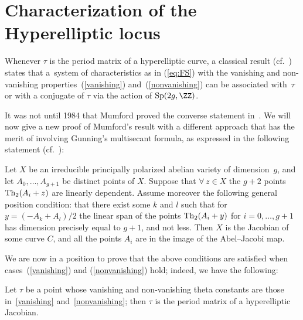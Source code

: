 \section{Characterization of the Hyperelliptic locus}
Whenever $\tau$ is the period matrix of a hyperelliptic curve, a classical result (cf.~\cite{Th}) states that a~system of characteristics as in (\ref{eq:FS}) with the vanishing and non-vanishing properties~(\ref{vanishing}) and~(\ref{nonvanishing}) can be associated with~$\tau$ or with a conjugate of $\tau$ via the action of ${\rm Sp}(2g, \ZZ)$.

 It was not until 1984 that Mumford proved the converse statement in~\cite{mu}. We will now give a new proof of Mumford's result with a different approach that has the merit of involving Gunning's multisecant formula, as expressed in the following statement (cf.~\cite{Gu}):
 \begin{Theorem} Let $X$ be an irreducible principally polarized abelian variety of dimension~$g$, and let $A_0, \dots , A_{g+1}$ be distinct points of $X$. Suppose that $\forall\, z\in X$ the $g + 2 $ points ${\rm Th}_2(A_i + z) $ are linearly dependent.
Assume moreover the following general position condition: that there
exist some $k$ and $l$ such that for $y=(-A_k+A_l)/2$ the linear span of the points ${\rm Th}_2(A_i + y) $ for $ i = 0 , \dots , g+1$ has dimension precisely equal to $g+1$, and
not less. Then $X$ is the Jacobian of some curve $C$, and all the points $A_i$ are in the image of the Abel--Jacobi map.
\end{Theorem}

We are now in a position to prove that the above conditions are satisfied when cases~(\ref{vanishing}) and (\ref{nonvanishing}) hold; indeed, we have the following:

\begin{Theorem} Let $\tau$ be a point whose vanishing and non-vanishing theta constants are those in~\eqref{vanishing} and~\eqref{nonvanishing}; then $\tau$ is the period
matrix of a hyperelliptic Jacobian.
\end{Theorem}

